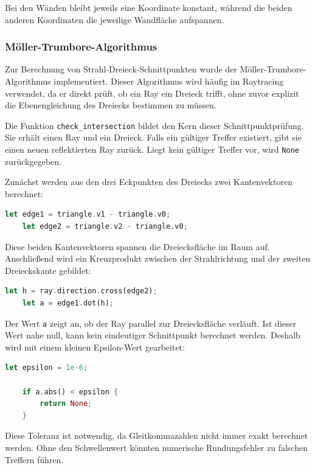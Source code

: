\documentclass{article}
\begin{document}
    Bei den Wänden bleibt jeweils eine Koordinate konstant, während die beiden
    anderen Koordinaten die jeweilige Wandfläche aufspannen.


    \subsubsection{Möller-Trumbore-Algorithmus}
    \label{subsubsec:moller-trumbore}

    Zur Berechnung von Strahl-Dreieck-Schnittpunkten wurde der
    Möller-Trumbore-Algorithmus implementiert. Dieser Algorithmus wird häufig im
    Raytracing verwendet, da er direkt prüft, ob ein Ray ein Dreieck trifft, ohne
    zuvor explizit die Ebenengleichung des Dreiecks bestimmen zu müssen.

    Die Funktion \texttt{check\_intersection} bildet den Kern dieser
    Schnittpunktprüfung. Sie erhält einen Ray und ein Dreieck. Falls ein gültiger
    Treffer existiert, gibt sie einen neuen reflektierten Ray zurück. Liegt kein
    gültiger Treffer vor, wird \texttt{None} zurückgegeben.

    Zunächst werden aus den drei Eckpunkten des Dreiecks zwei Kantenvektoren
    berechnet:

    \begin{lstlisting}[language=Rust]
    let edge1 = triangle.v1 - triangle.v0;
    let edge2 = triangle.v2 - triangle.v0;
    \end{lstlisting}

    Diese beiden Kantenvektoren spannen die Dreiecksfläche im Raum auf.
    Anschließend wird ein Kreuzprodukt zwischen der Strahlrichtung und der zweiten
    Dreieckskante gebildet:

    \begin{lstlisting}[language=Rust]
    let h = ray.direction.cross(edge2);
    let a = edge1.dot(h);
    \end{lstlisting}

    Der Wert \texttt{a} zeigt an, ob der Ray parallel zur Dreiecksfläche
    verläuft. Ist dieser Wert nahe null, kann kein eindeutiger Schnittpunkt
    berechnet werden. Deshalb wird mit einem kleinen Epsilon-Wert gearbeitet:

    \begin{lstlisting}[language=Rust]
    let epsilon = 1e-6;

    if a.abs() < epsilon {
        return None;
    }
    \end{lstlisting}

    Diese Toleranz ist notwendig, da Gleitkommazahlen nicht immer exakt berechnet
    werden. Ohne den Schwellenwert könnten numerische Rundungsfehler zu falschen
    Treffern führen.
\end{document}

